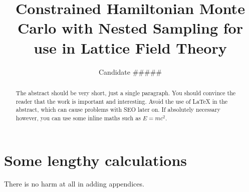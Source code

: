 \documentclass[aps,prd,reprint,preprintnumbers,showpacs,floatfix,nofootinbib,superscript address]{revtex4-2}
\begin{document}
\title{Constrained Hamiltonian Monte Carlo with Nested Sampling for use in Lattice Field Theory}

\author{Candidate \#\#\#\#\#}

\begin{abstract}
	The abstract should be very short, just a single paragraph. You should convince the reader that the work is important and interesting. Avoid the use of \LaTeX{} in the abstract, which can cause problems with SEO later on. If absolutely necessary however, you can use some inline maths such as $E=mc^2$.
\end{abstract}


\maketitle











\appendix
\section{Some lengthy calculations}\label{Appendix}
There is no harm at all in adding appendices.
\end{document}
